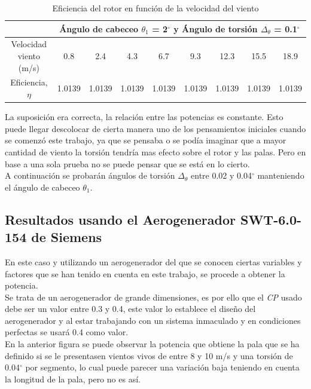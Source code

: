 \begin{table}[H]
\centering
\begin{tabular}{c|cccccccc|}
\cline{2-9}
\multicolumn{1}{l|}{} &
  \multicolumn{8}{c|}{Ángulo de cabeceo $\theta_1$ = 2$^{\circ}$ y Ángulo de torsión $\Delta_\theta$ = 0.1$^{\circ}$} \\ \hline
\multicolumn{1}{|c|}{Velocidad viento (m/s)} &
  \multicolumn{1}{c|}{0.8} &
  \multicolumn{1}{c|}{2.4} &
  \multicolumn{1}{c|}{4.3} &
  \multicolumn{1}{c|}{6.7} &
  \multicolumn{1}{c|}{9.3} &
  \multicolumn{1}{c|}{12.3} &
  \multicolumn{1}{c|}{15.5} &
  18.9 \\ \hline
\multicolumn{1}{|c|}{Eficiencia, $\eta$} &
  \multicolumn{1}{c|}{1.0139} &
  \multicolumn{1}{c|}{1.0139} &
  \multicolumn{1}{c|}{1.0139} &
  \multicolumn{1}{c|}{1.0139} &
  \multicolumn{1}{c|}{1.0139} &
  \multicolumn{1}{c|}{1.0139} &
  \multicolumn{1}{c|}{1.0139} &
  1.0139 \\ \hline
\end{tabular}
    \caption{Eficiencia del rotor en función de la velocidad del viento}
     \label{tabla:eficiencia_primer_intento}
\end{table}

La suposición era correcta, la relación entre las potencias es constante. Esto puede llegar descolocar de cierta manera uno de los pensamientos iniciales cuando se comenzó este trabajo, ya que se pensaba o se podía imaginar que a mayor cantidad de viento la torsión tendría mas efecto sobre el rotor y las palas. Pero en base a una sola prueba no se puede pensar que se está en lo cierto. \\

A continuación se probarán ángulos de torsión $\Delta_\theta$ entre 0.02 y 0.04$^{\circ}$  manteniendo el ángulo de cabeceo $\theta_1$.


\subsection{Resultados usando el Aerogenerador SWT-6.0-154\cite{Siemens2022} de Siemens}

En este caso y utilizando un aerogenerador del que se conocen ciertas variables y factores que se han tenido en cuenta en este trabajo, se procede a obtener la potencia.\\

Se trata de un aerogenerador de grande dimensiones, es por ello que el \textit{CP} usado debe ser un valor entre 0.3 y 0.4, este valor lo establece el diseño del aerogenerador y al estar trabajando con un sistema inmaculado y en condiciones perfectas se usará 0.4 como valor.\\




En la anterior figura se puede observar la potencia que obtiene la pala que se ha definido si se le presentasen vientos vivos de entre 8 y 10 m/s y una torsión de 0.04$^{\circ}$ por segmento, lo cual puede parecer una variación baja teniendo en cuenta la longitud de la pala, pero no es así.\\